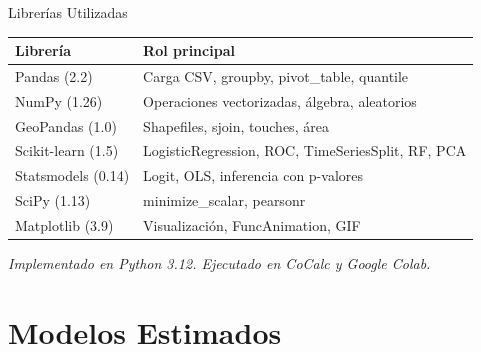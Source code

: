 \documentclass[11pt]{beamer}
\begin{document}
\begin{frame}{Librerías Utilizadas}

\begin{table}[h]
\centering
\small
\begin{tabular}{l l}
\toprule
\textbf{Librería} & \textbf{Rol principal} \\
\midrule
Pandas (2.2) & Carga CSV, groupby, pivot\_table, quantile \\
NumPy (1.26) & Operaciones vectorizadas, álgebra, aleatorios \\
GeoPandas (1.0) & Shapefiles, sjoin, touches, área \\
Scikit-learn (1.5) & LogisticRegression, ROC, TimeSeriesSplit, RF, PCA \\
Statsmodels (0.14) & Logit, OLS, inferencia con p-valores \\
SciPy (1.13) & minimize\_scalar, pearsonr \\
Matplotlib (3.9) & Visualización, FuncAnimation, GIF \\
\bottomrule
\end{tabular}
\end{table}

\vspace{0.3cm}
\begin{center}
\footnotesize \textit{Implementado en Python 3.12. Ejecutado en CoCalc y Google Colab.}
\end{center}
\end{frame}

\section{Modelos Estimados}
\end{document}
